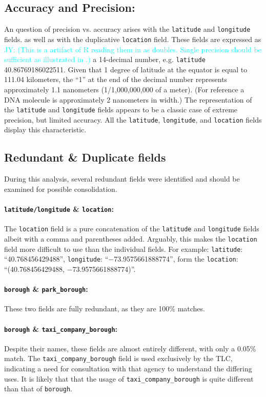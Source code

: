 \documentclass[linenumber]{jdsart}
\newcommand{\jy}[1]{\textcolor{cyan}{JY: (#1)}}
\begin{document}
\subsection{Accuracy and Precision:}
\label{sec:precision}
An question of precision vs. accuracy arises with the \texttt{latitude} 
and \texttt{longitude} fields. as well as with the duplicative 
\texttt{location} field. These fields are expressed as
\jy{This is a artifact of R reading them in as doubles. Single
  precision should be sufficient as illustrated in \citet{bates2024csv}.}
a 14\mbox{-}decimal number, e.g. \texttt{latitude} 40.86769186022511. 
Given that 1 degree of latitude at the equator is equal to 111.04 
kilometers, the ``1'' at the end of the decimal number represents 
approximately 1.1 nanometers (1/1,000,000,000 of a meter). (For 
reference a DNA molecule is approximately 2 nanometers in width.) The 
representation of the \texttt{latitude} and \texttt{longitude} fields
appears to be a classic case of extreme precision, but limited 
accuracy. All the \texttt{latitude}, \texttt{longitude}, and \texttt{location}
fields display this characteristic. 


\subsection{Redundant \& Duplicate fields}
\label{sec:duplicates}
During this analysis, several redundant fields were identified and should 
be examined for possible consolidation.

\paragraph{\texttt{latitude/longitude} \& \texttt{location}:} 
The \texttt{location} field is a pure concatenation of 
the \texttt{latitude} and \texttt{longitude} fields albeit with a 
comma and parentheses added. Arguably, this makes the \texttt{location} field 
more difficult to use than the individual fields. For example:  
\texttt{latitude}: ``40.768456429488'', \texttt{longitude}: ``$-$73.9575661888774'', 
form the \texttt{location}: ``(40.768456429488, $-$73.9575661888774)''.

\paragraph{\texttt{borough} \& \texttt{park\_borough}:} These two fields are fully redundant, 
as they are 100\% matches.

\paragraph{\texttt{borough} \& \texttt{taxi\_company\_borough}:} Despite 
their names, these fields are almost entirely different, with only 
a 0.05\% match. The \texttt{taxi\_company\_borough} field is 
used exclusively by the TLC, indicating a need for consultation 
with that agency to understand the differing uses. It is 
likely that that the usage of \texttt{taxi\_company\_borough} is 
quite different than that of \texttt{borough}. 
\end{document}
